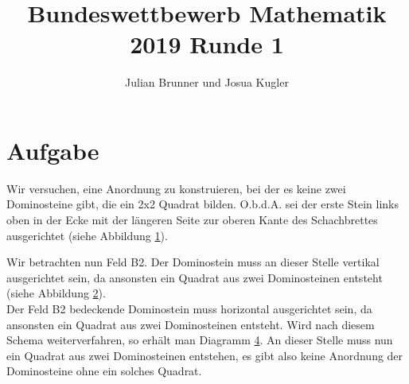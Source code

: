 \documentclass{article}
\title{Bundeswettbewerb Mathematik 2019 Runde 1}
\author{Julian Brunner und Josua Kugler}
\numberwithin{equation}{section}
\begin{document}
	\maketitle
	\newpage
	\section{Aufgabe}
	Wir versuchen, eine Anordnung zu konstruieren, bei der es keine zwei Dominosteine gibt, die ein 2x2 Quadrat bilden.
	O.b.d.A. sei der erste Stein links oben in der Ecke mit der längeren Seite zur oberen Kante des Schachbrettes ausgerichtet (siehe Abbildung \ref{anfang1}).
	\begin{figure}
		\begin{subfigure}{0.33\textwidth}
			
			\label{anfang1}
		\end{subfigure}
		\begin{subfigure}{0.33\textwidth}
			
			\label{b21}
		\end{subfigure}
		\begin{subfigure}{0.32\textwidth}
			
			\label{ende1}
		\end{subfigure}
	\end{figure}
	Wir betrachten nun Feld B2. Der Dominostein muss an dieser Stelle vertikal ausgerichtet sein, da ansonsten ein Quadrat aus zwei Dominosteinen entsteht (siehe Abbildung \ref{b21}).\\
	Der Feld B2 bedeckende Dominostein muss horizontal ausgerichtet sein, da ansonsten ein Quadrat aus zwei Dominosteinen entsteht. Wird nach diesem Schema weiterverfahren, so erhält man Diagramm \ref{ende1}.
	An dieser Stelle muss nun ein Quadrat aus zwei Dominosteinen entstehen, es gibt also keine Anordnung der Dominosteine ohne ein solches Quadrat.
	\newpage
\end{document}
